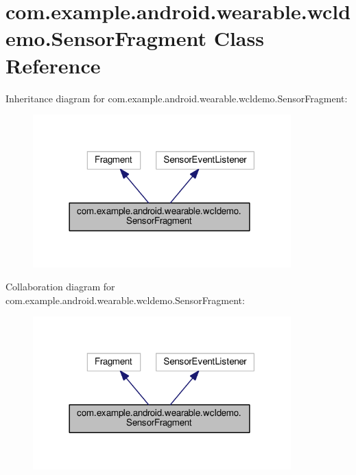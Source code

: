 \hypertarget{classcom_1_1example_1_1android_1_1wearable_1_1wcldemo_1_1SensorFragment}{}\section{com.\+example.\+android.\+wearable.\+wcldemo.\+Sensor\+Fragment Class Reference}
\label{classcom_1_1example_1_1android_1_1wearable_1_1wcldemo_1_1SensorFragment}


Inheritance diagram for com.\+example.\+android.\+wearable.\+wcldemo.\+Sensor\+Fragment\+:\nopagebreak
\begin{figure}[H]
\begin{center}
\leavevmode
\includegraphics[width=282pt]{db/dad/classcom_1_1example_1_1android_1_1wearable_1_1wcldemo_1_1SensorFragment__inherit__graph}
\end{center}
\end{figure}


Collaboration diagram for com.\+example.\+android.\+wearable.\+wcldemo.\+Sensor\+Fragment\+:\nopagebreak
\begin{figure}[H]
\begin{center}
\leavevmode
\includegraphics[width=282pt]{dc/d3a/classcom_1_1example_1_1android_1_1wearable_1_1wcldemo_1_1SensorFragment__coll__graph}
\end{center}
\end{figure}
